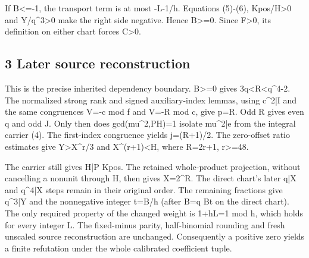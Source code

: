 If B\textless{}\allowbreak{}=\allowbreak{}-1, the transport term is at most -L-1/\allowbreak{}h. Equations (5)-(6), Kpos/\allowbreak{}H\textgreater{}\allowbreak{}0 and Y/\allowbreak{}q\textasciicircum{}\allowbreak{}3\textgreater{}\allowbreak{}0 make the right side negative. Hence B\textgreater{}\allowbreak{}=\allowbreak{}0. Since F\textgreater{}\allowbreak{}0, its definition on either chart forces C\textgreater{}\allowbreak{}0.



\subsection{3 Later source reconstruction}



This is the precise inherited dependency boundary. B\textgreater{}\allowbreak{}=\allowbreak{}0 gives 3q\textless{}\allowbreak{}R\textless{}\allowbreak{}q\textasciicircum{}\allowbreak{}4-2. The normalized strong rank and signed auxiliary-index lemmas, using c\textasciicircum{}\allowbreak{}2|I and the same congruences V=\allowbreak{}-c mod f and V=\allowbreak{}-R mod c, give p=\allowbreak{}R. Odd R gives even q and odd J. Only then does gcd(mu\textasciicircum{}\allowbreak{}2,PH)=\allowbreak{}1 isolate mu\textasciicircum{}\allowbreak{}2|e from the integral carrier (4). The first-index congruence yields j=\allowbreak{}(R+\allowbreak{}1)/\allowbreak{}2. The zero-offset ratio estimates give Y\textgreater{}\allowbreak{}X\textasciicircum{}\allowbreak{}r/\allowbreak{}3 and X\textasciicircum{}\allowbreak{}(r+\allowbreak{}1)\textless{}\allowbreak{}H, where R=\allowbreak{}2r+\allowbreak{}1, r\textgreater{}\allowbreak{}=\allowbreak{}48.



The carrier still gives H|P Kpos. The retained whole-product projection, without cancelling a nonunit through H, then gives X=\allowbreak{}2\textasciicircum{}\allowbreak{}R. The direct chart's later q|X and q\textasciicircum{}\allowbreak{}4|X steps remain in their original order. The remaining fractions give q\textasciicircum{}\allowbreak{}3|Y and the nonnegative integer t=\allowbreak{}B/\allowbreak{}h (after B=\allowbreak{}q Bt on the direct chart). The only required property of the changed weight is 1+\allowbreak{}hL=\allowbreak{}1 mod h, which holds for every integer L. The fixed-minus parity, half-binomial rounding and fresh unscaled source reconstruction are unchanged. Consequently a positive zero yields a finite refutation under the whole calibrated coefficient tuple.



